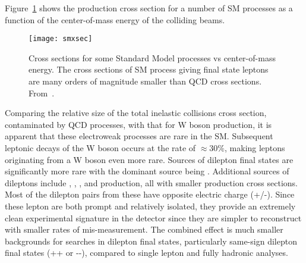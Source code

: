 Figure~\ref{fig:intro_smxsec} shows the production cross section for a number of SM
processes as a function of the center-of-mass energy of the colliding beams.
\begin{figure}[tbhp]
\centering
\texttt{[image: smxsec]}
\caption[Cross sections for some Standard Model process vs center-of-mass energy] 
{\label{fig:intro_smxsec}
Cross sections for some Standard Model processes vs center-of-mass energy.
The cross sections of SM process giving final state leptons are many orders of
magnitude smaller than QCD cross sections. From~\cite{smxsec}.
}
\end{figure}
Comparing the relative size of the total inelastic collisions cross section,
contaminated by QCD processes, with that for W boson production, it is apparent
that these electroweak processes are rare in the SM. Subsequent leptonic
decays of the W boson occurs at the rate of $\approx 30\%$, making leptons
originating from a W boson even more rare. Sources of dilepton final states
are significantly more rare with the dominant source being \Zlplm. Additional
sources of dileptons include \ttbar, \WW, \WZ, and \ZZ production, all
with smaller production cross sections. Most of the dilepton pairs from these
have opposite electric charge (+/-). Since these lepton are both prompt and
relatively isolated, they provide an extremely clean experimental signature
in the detector since they are simpler to reconstruct with smaller rates of
mis-measurement. The combined effect is much smaller backgrounds for searches
in dilepton final states, particularly same-sign dilepton final states ({+}{+}
or {-}{-}), compared to single lepton and fully hadronic analyses.

